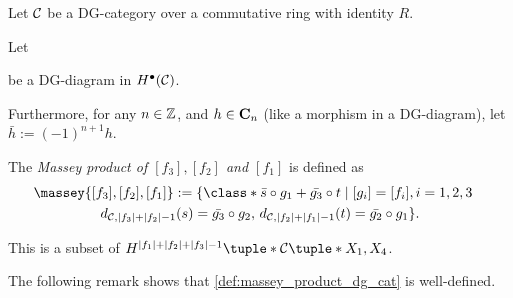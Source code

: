 \begin{definition}
    \label{def:massey_product_dg_cat}
    Let \( {\mathcal{C}} \) be a DG-category over a commutative ring with identity \( R \).

    Let 
    \begin{center}
    \end{center}
    be a DG-diagram in \( H^\bullet({\mathcal{C}}) \).

    Furthermore, for any \( n \in {\mathbb{Z}} \), and \( h \in \operatorname{\mathbf{C}}_n \) (like a morphism in a DG-diagram), let \( \bar{h} := (-1)^{n + 1}h \).

    The \emph{Massey product of \( [f_3], [f_2] \) and \( [f_1] \)} is defined as
    \begin{multline*}
        \massey{[f_3], [f_2], [f_1]} :=
        \{
            \class*{
                \bar{s} \circ g_1 + \bar{g_3} \circ t
            }
            \mid [g_i] = [f_i], i = 1, 2, 3 \quad \\
            d_{\Cc, |f_3| + |f_2| - 1}(s) = \bar{g_3} \circ g_2, \,
            d_{\Cc, |f_2| + |f_1| - 1}(t) = \bar{g_2} \circ g_1
        \}.
    \end{multline*}

    This is a subset of \( H^{|f_1| + |f_2| + |f_3| - 1}\tuple*{\Cc\tuple*{X_1, X_4}} \).
\end{definition}

The following remark shows that \autoref{def:massey_product_dg_cat} is well-defined.

